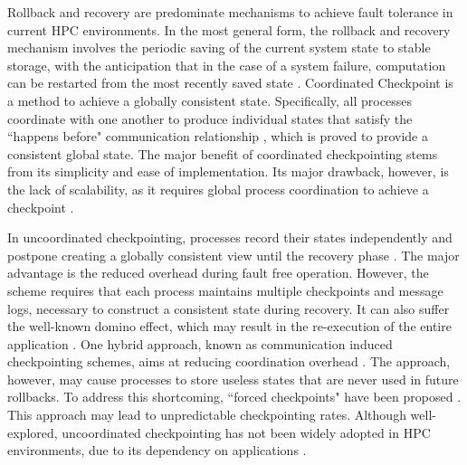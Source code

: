 Rollback and recovery are predominate mechanisms to achieve fault
tolerance in current HPC environments. In the most general form, the rollback and recovery mechanism
involves the periodic saving of the current system state to stable storage, with the anticipation that
in the case of a system failure, computation can be restarted from the most recently saved state \cite{Elnozahy:02:Survey}. %
Coordinated
Checkpoint is a method to achieve a globally consistent state. Specifically, all processes
coordinate with one another to produce individual states that satisfy the ``happens before"
communication relationship \cite{chandy_trans_1972}, which is proved to provide a consistent global state.
The major benefit of coordinated
checkpointing stems from its simplicity and ease of implementation. Its major drawback, however, is the
lack of scalability, as it requires global process coordination to achieve a checkpoint 
\cite{elnozahy_dsc_2004,riesen_sandia_2010,
hargrove2006berkeley}.


In uncoordinated checkpointing, processes record their states independently and postpone creating a 
globally consistent view until the recovery phase \cite{plank_ftc_1999}. The major advantage is the reduced overhead during fault free operation. However, the scheme requires that
each process maintains multiple checkpoints and message logs, necessary to construct a consistent 
state during recovery. It can also suffer the well-known domino effect, which may result in the 
re-execution of the entire application \cite{randell_domino_effect}. One hybrid approach, known as communication induced 
checkpointing schemes, aims at reducing coordination overhead \cite{alvisi_ftc_1999}. The approach, however, may 
cause processes to store useless states that are never used in future rollbacks. To address this 
shortcoming, ``forced checkpoints" have been proposed \cite{helary_rds_1997}. This approach may lead to unpredictable
checkpointing rates. Although well-explored, uncoordinated checkpointing has not been widely adopted
in HPC environments, due to its dependency on applications \cite{zheng_2004_ftccharm,guermouche_2011_ipdps}.


